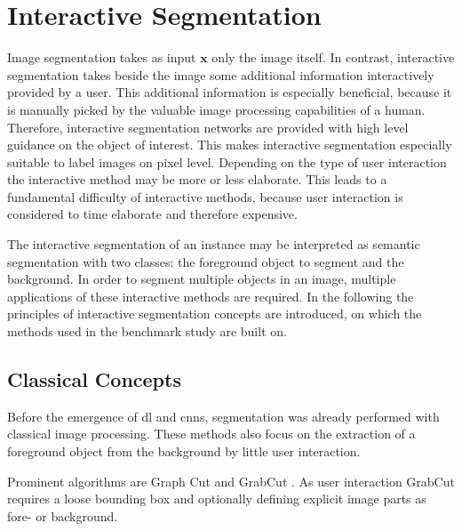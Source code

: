 
\section{Interactive Segmentation}\label{ord:ch2:sec3}

Image segmentation takes as input $\textbf{x}$ only the image itself.
In contrast, interactive segmentation takes beside the image some additional information interactively provided by a user.
This additional information is especially beneficial, because it is manually picked by the valuable image processing capabilities of a human.
Therefore, interactive segmentation networks are provided with high level guidance on the object of interest.
This makes interactive segmentation especially suitable to label images on pixel level.
Depending on the type of user interaction the interactive method may be more or less elaborate.
This leads to a fundamental difficulty of interactive methods, because user interaction is considered to time elaborate and therefore expensive.

The interactive segmentation of an instance may be interpreted as semantic segmentation with two classes: the foreground object to segment and the background.
In order to segment multiple objects in an image, multiple applications of these interactive methods are required.
In the following the principles of interactive segmentation concepts are introduced, on which the methods used in the benchmark study are built on.

\subsection{Classical Concepts}\label{ord:ch2:sec3:subsec1}
Before the emergence of \gls{dl} and \glspl{cnn}, segmentation was already performed with classical image processing.
These methods also focus on the extraction of a foreground object from the background by little user interaction.

Prominent algorithms are Graph Cut \cite{BJ01-GraphCut} and GrabCut \cite{RKB04-GrabCut}.
As user interaction GrabCut requires a loose bounding box and optionally defining explicit image parts as fore- or background.

